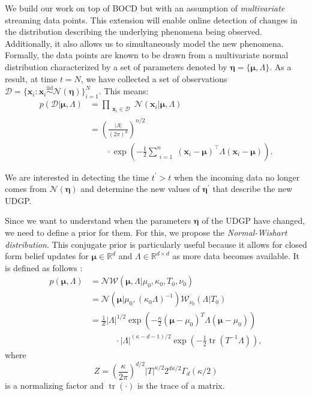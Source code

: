 \documentclass[Afour,sageh,times]{sagej}
\theoremstyle{lemma}
\begin{document}
We build our work on top of BOCD but with an assumption of {\em multivariate} streaming data points. 
This extension will enable online detection of changes in the distribution describing the underlying phenomena being observed. Additionally, it also allows us to simultaneously model the new phenomena.
Formally, the data points are known to be drawn from a multivariate normal distribution characterized by a set of parameters denoted by \( \boldsymbol{\eta} = \{\boldsymbol{\mu}, \Lambda\} \). 
As a result, at time $t = N$, we have collected a set of observations $\mathcal{D} = \{\boldsymbol{x}_i : \boldsymbol{x}_i \overset{\mathrm{iid}}{\sim} \mathcal{N}(\boldsymbol{\eta}) \}_{i=1}^N$. This means: 
\begin{align} \label{eq:sampling-model}
    p(\mathcal{D} | \boldsymbol{\mu}, \Lambda) &= \prod_{\substack{\boldsymbol{x}_i \in \mathcal{D}}} \mathcal{N} (\boldsymbol{x}_i | \boldsymbol{\mu}, \Lambda)  \\&= \left( \frac{|\Lambda|}{(2 \pi)^{d}} \right)^{n/2} \nonumber \\ & \quad\quad \cdot \exp{ \left( -\frac{1}{2} \sum_{\substack{i=1}}^n (\boldsymbol{x}_i - \boldsymbol{\mu})^\top \Lambda (\boldsymbol{x}_i - \boldsymbol{\mu}) \right) \nonumber}. 
\end{align}

We are interested in detecting the time $t^\prime > t$ when the incoming data no longer comes from $\mathcal{N}(\boldsymbol{\eta})$ and determine the new values of $\boldsymbol{\eta}^\prime$ that describe the new UDGP.

Since we want to understand when the parameters $\boldsymbol{\eta}$ of the UDGP have changed, we need to define a prior for them. For this, we propose the \textit{Normal-Wishart distribution}. 
This conjugate prior is particularly useful because it allows for closed form belief updates for $\boldsymbol{\mu} \in \mathbb{R}^d$ and $\Lambda \in \mathbb{R}^{d \times d}$ as more data becomes available. It is defined as follows \cite[]{murphy2007conjugateforms}:
\begin{align} \label{eq:normal-wishart-prior}
    p(\boldsymbol{\mu}, \Lambda) &=\mathcal{NW}(\boldsymbol{\mu}, \Lambda | \mu_0, \kappa_0, T_0, \nu_0) \\&= \mathcal{N}(\boldsymbol{\mu} | \mu_0, (\kappa_0 \Lambda)^{-1}) \mathcal{W}_{\nu_0}(\Lambda | T_0) \nonumber \\
    &= \frac{1}{Z} |\Lambda|^{1/2} \exp \left( -\frac{\kappa}{2} (\boldsymbol{\mu} - \mu_0)^T \Lambda (\boldsymbol{\mu} - \mu_0) \right) \nonumber \\
    & \quad \quad \quad \cdot |\Lambda|^{(\kappa - d - 1)/2} \exp \left( -\frac{1}{2} \operatorname{tr}(T^{-1} \Lambda) \right), \nonumber
\end{align}
where
\[
    Z = \left( \frac{\kappa}{2 \pi} \right)^{d/2} |T|^{\kappa / 2} 2^{d \kappa / 2} \Gamma_d(\kappa / 2)
\]
is a normalizing factor and $\operatorname{tr}(\cdot)$ is the trace of a matrix.
\end{document}
